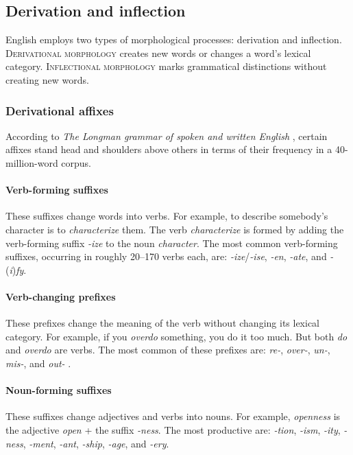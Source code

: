 \subsection{Derivation and inflection} \label{sec:derivation}

English employs two types of morphological processes: derivation and inflection. \textsc{Derivational morphology} creates new words or changes a word's lexical category. \textsc{Inflectional morphology} marks grammatical distinctions without creating new words.

\subsubsection*{Derivational affixes}

According to \textit{The Longman grammar of spoken and written English} \citep[401]{Biber1999}, certain affixes stand head and shoulders above others in terms of their frequency in a 40-million-word corpus.

\paragraph*{Verb-forming suffixes} These suffixes change words into verbs. For example, to describe somebody's character is to \textit{characterize} them. The verb \textit{characterize} is formed by adding the verb-forming suffix \textit{-ize} to the noun \textit{character}. The most common verb-forming suffixes, occurring in roughly 20--170 verbs each, are: \textit{-ize}/\textit{-ise}, \textit{-en}, \textit{-ate}, and \textit{-}(\textit{i})\textit{fy}.

\paragraph*{Verb-changing prefixes} These prefixes change the meaning of the verb without changing its lexical category. For example, if you \textit{overdo} something, you do it too much. But both \textit{do} and \textit{overdo} are verbs. The most common of these prefixes are: \textit{re-}, \textit{over-}, \textit{un-}, \textit{mis-}, and \textit{out-} \citep[400]{Biber1999}.

\paragraph*{Noun-forming suffixes} These suffixes change adjectives and verbs into nouns. For example, \textit{openness} is the adjective \textit{open} + the suffix \textit{-ness}. The most productive are: \textit{-tion}, \textit{-ism}, \textit{-ity}, \textit{-ness}, \textit{-ment}, \textit{-ant}, \textit{-ship}, \textit{-age}, and \textit{-ery}.

